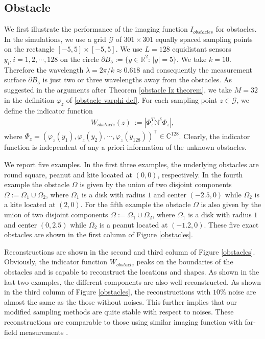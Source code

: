 \documentclass[final]{siamltex}
\newcommand{\R}{{\mathbb R}}
\newcommand{\C}{{\mathbb C}}
\newcommand{\be}{\begin{eqnarray}}
\newcommand{\en}{\end{eqnarray}}
\newcommand{\pa}{\partial}
\begin{document}
\subsection{Obstacle}
We first  illustrate the performance of the   imaging function $I_{obstacles}$ for obstacles.
In the simulations, we use a grid $\mathcal{G}$ of $301\times 301$ equally spaced sampling points on the rectangle $[-5,5]\times[-5,5]$.
We use $L=128$ equidistant sensors $y_i,i=1,2,\cdots,128$  on the circle $\partial B_5:=\{y\in\R^2:\, |y|=5\}$.
We take $k=10$. Therefore the wavelength $\lambda=2\pi/k\approx 0.618$ and consequently the measurement surface $\pa B_5$ is just two or three wavelengths away from the obstacles.
As suggested in the arguments after Theorem \ref{obstacle Iz theorem}, we take $M=32$ in the definition $\varphi_z$ of \eqref{obstacle varphi def}.
For each sampling point $z \in \mathcal{G}$, we define the indicator function
\be\label{obstacleindicator}
W_{obstacle}(z)\ :=|\Phi_z^{T}\mathbb{N}^{\delta}\Phi_z|,
\en
where $\Phi_z=(\varphi_z(y_1), \varphi_z(y_2),\cdots, \varphi_z(y_{128}))^\top \in \C^{128}$.
Clearly, the indicator function is independent of any a priori information of the unknown obstacles.

We report five examples. In the first three examples, the underlying obstacles are round square, peanut and kite located at $(0,0)$, respectively. In the 
fourth example the obstacle $\Omega$ is given by the union of two disjoint components $\Omega:=\Omega_1\cup\Omega_2$, where $\Omega_1$ is a disk with radius $1$ and center $(-2.5, 0)$ while $\Omega_2$ is a kite located at $(2,0)$. For the fifth example the obstacle $\Omega$ is also given by the union of two disjoint components $\Omega:=\Omega_1\cup\Omega_2$, where $\Omega_1$ is a disk with radius $1$ and center $(0, 2.5)$ while $\Omega_2$ is a peanut located at $(-1.2,0)$.
These five exact obstacles are shown in the first column of Figure \ref{obstacles}.


Reconstructions are shown in the second and third column of Figure \ref{obstacles}. Obviously, the indicator function $W_{obstacle}$ peaks on the boundaries of the obstacles and is capable to reconstruct  the locations and shapes. As shown in the last two examples, the different components are also well reconstructed. 
As shown in the third column of Figure \ref{obstacles}, the reconstructions with $10\%$ noise are almost the same as the those without noises. This further implies that our modified sampling methods are quite stable with respect to noises. These reconstructions are comparable to those using similar imaging function with far-field measurements \cite{LiuIP17}.
\end{document}
